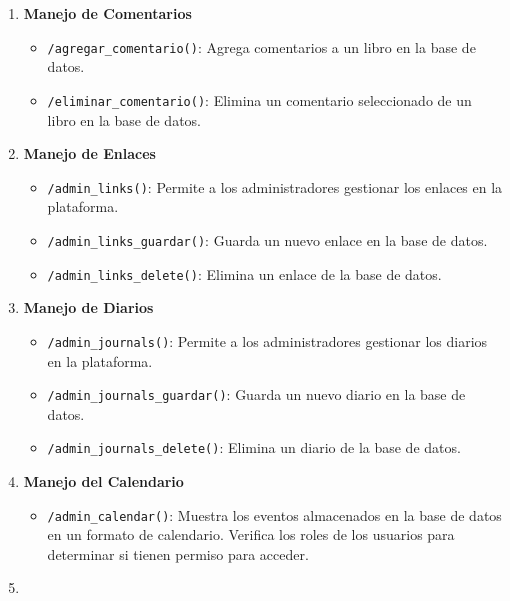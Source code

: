 \documentclass[a4paper, 12pt]{book}
\begin{document}
\begin{enumerate}
    \item \textbf{Manejo de Comentarios}
    \begin{itemize}
        \item \texttt{/agregar\_comentario()}: Agrega comentarios a un libro en la base de datos.
        \item \texttt{/eliminar\_comentario()}: Elimina un comentario seleccionado de un libro en la base de datos.
    \end{itemize}

    \item \textbf{Manejo de Enlaces}
    \begin{itemize}
        \item \texttt{/admin\_links()}: Permite a los administradores gestionar los enlaces en la plataforma.
        \item \texttt{/admin\_links\_guardar()}: Guarda un nuevo enlace en la base de datos.
        \item \texttt{/admin\_links\_delete()}: Elimina un enlace de la base de datos.
    \end{itemize}

    \item \textbf{Manejo de Diarios}
    \begin{itemize}
        \item \texttt{/admin\_journals()}: Permite a los administradores gestionar los diarios en la plataforma.
        \item \texttt{/admin\_journals\_guardar()}: Guarda un nuevo diario en la base de datos.
        \item \texttt{/admin\_journals\_delete()}: Elimina un diario de la base de datos.
    \end{itemize}

    \item \textbf{Manejo del Calendario}
    \begin{itemize}
        \item \texttt{/admin\_calendar()}: Muestra los eventos almacenados en la base de datos en un formato de calendario. Verifica los roles de los 
        usuarios para determinar si tienen permiso para acceder.
    \end{itemize}
    \item \textbf{}
\end{enumerate}
\end{document}
